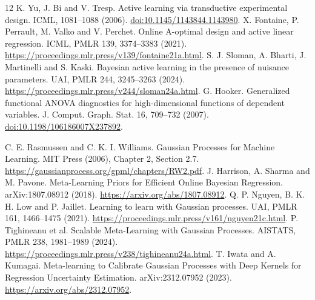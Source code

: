 \begin{thebibliography}{12}
 K. Yu, J. Bi and V. Tresp. Active learning via transductive experimental design. ICML, 1081--1088 (2006). \href{https://doi.org/10.1145/1143844.1143980}{doi:10.1145/1143844.1143980}.
 X. Fontaine, P. Perrault, M. Valko and V. Perchet. Online A-optimal design and active linear regression. ICML, PMLR 139, 3374--3383 (2021). \url{https://proceedings.mlr.press/v139/fontaine21a.html}.
 S. J. Sloman, A. Bharti, J. Martinelli and S. Kaski. Bayesian active learning in the presence of nuisance parameters. UAI, PMLR 244, 3245--3263 (2024). \url{https://proceedings.mlr.press/v244/sloman24a.html}.
 G. Hooker. Generalized functional ANOVA diagnostics for high-dimensional functions of dependent variables. J. Comput. Graph. Stat. 16, 709--732 (2007). \href{https://doi.org/10.1198/106186007X237892}{doi:10.1198/106186007X237892}.


 C. E. Rasmussen and C. K. I. Williams. Gaussian Processes for Machine Learning. MIT Press (2006), Chapter 2, Section 2.7. \url{https://gaussianprocess.org/gpml/chapters/RW2.pdf}.
 J. Harrison, A. Sharma and M. Pavone. Meta-Learning Priors for Efficient Online Bayesian Regression. arXiv:1807.08912 (2018). \url{https://arxiv.org/abs/1807.08912}.
 Q. P. Nguyen, B. K. H. Low and P. Jaillet. Learning to learn with Gaussian processes. UAI, PMLR 161, 1466--1475 (2021). \url{https://proceedings.mlr.press/v161/nguyen21c.html}.
 P. Tighineanu et al. Scalable Meta-Learning with Gaussian Processes. AISTATS, PMLR 238, 1981--1989 (2024). \url{https://proceedings.mlr.press/v238/tighineanu24a.html}.
 T. Iwata and A. Kumagai. Meta-learning to Calibrate Gaussian Processes with Deep Kernels for Regression Uncertainty Estimation. arXiv:2312.07952 (2023). \url{https://arxiv.org/abs/2312.07952}.

\end{thebibliography}
